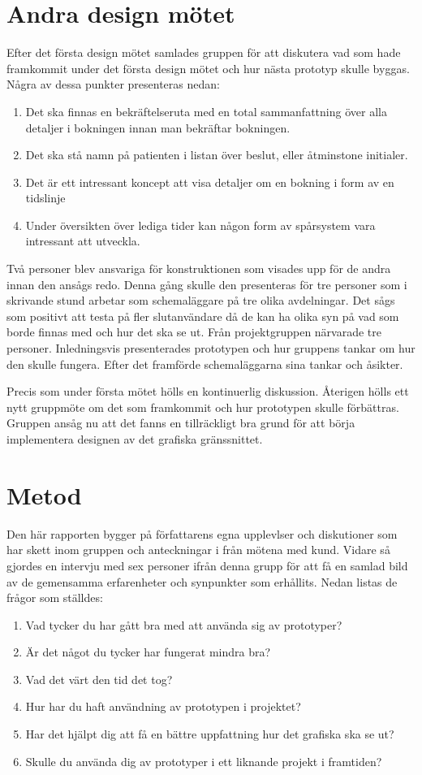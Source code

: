 \section{Andra design mötet}
Efter det första design mötet samlades gruppen för att diskutera vad som hade framkommit under det första design mötet och hur nästa prototyp skulle byggas. Några av dessa punkter  presenteras nedan:
\begin{enumerate}
	\item Det ska finnas en bekräftelseruta med en total sammanfattning över alla detaljer i bokningen innan man 	 			  	  bekräftar bokningen.
 	\item Det ska stå namn på patienten i listan över beslut, eller åtminstone initialer.
 	\item Det är ett intressant koncept att visa detaljer om en bokning i form av en tidslinje
 	\item Under översikten över lediga tider kan någon form av spårsystem vara intressant att utveckla.
\end{enumerate}
Två personer blev ansvariga för konstruktionen som visades upp för de andra innan den ansågs redo. Denna gång skulle den presenteras för tre personer som i skrivande stund arbetar som schemaläggare på tre olika avdelningar. Det sågs som positivt att testa på fler slutanvändare då de kan ha olika syn på vad som borde finnas med och hur det ska se ut. Från projektgruppen närvarade tre personer. Inledningsvis presenterades prototypen och hur gruppens tankar om hur den skulle fungera. Efter det framförde schemaläggarna sina tankar och åsikter. 

Precis som under första mötet hölls en kontinuerlig diskussion. Återigen hölls ett nytt gruppmöte om det som framkommit och hur prototypen skulle förbättras. Gruppen ansåg nu att det fanns en tillräckligt bra grund för att börja implementera designen av det grafiska gränssnittet.
  
\section{Metod}
Den här rapporten bygger på författarens egna upplevlser och diskutioner som har skett inom gruppen och anteckningar i från mötena med kund. Vidare så gjordes en intervju med sex personer ifrån denna grupp för att få en samlad bild av de gemensamma erfarenheter och synpunkter som erhållits. Nedan listas de frågor som ställdes:
\begin{enumerate}
	\item Vad tycker du har gått bra med att använda sig av prototyper?
 	\item Är det något du tycker har fungerat mindra bra?
 	\item Vad det värt den tid det tog?
 	\item Hur har du haft användning av prototypen i projektet?
 	\item Har det hjälpt dig att få en bättre uppfattning hur det grafiska ska se ut?
 	\item Skulle du använda dig av prototyper i ett liknande projekt i framtiden? 
\end{enumerate}
 
